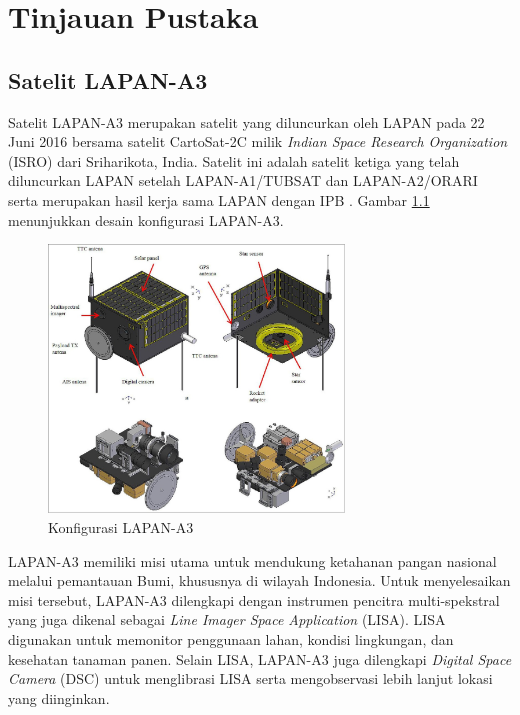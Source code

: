 \chapter{Tinjauan Pustaka}

\section{Satelit LAPAN-A3}

Satelit LAPAN-A3 merupakan satelit yang diluncurkan oleh LAPAN pada 22 Juni
2016 bersama satelit CartoSat-2C milik \textit{Indian Space Research
Organization} (ISRO) dari Sriharikota, India. Satelit ini adalah satelit ketiga
yang telah diluncurkan LAPAN setelah LAPAN-A1/TUBSAT dan LAPAN-A2/ORARI serta
merupakan hasil kerja sama LAPAN dengan IPB \cite{hasbi2013}. Gambar
\ref{fig:a3overview} menunjukkan desain konfigurasi LAPAN-A3.

\begin{figure}[!ht]
\setlength{}
\begin{center}
\includegraphics[width=0.7\textwidth]{fig/a3overview.jpg}
\caption{Konfigurasi LAPAN-A3}
\label{fig:a3overview}
\end{center}
\end{figure}

LAPAN-A3 memiliki misi utama untuk mendukung ketahanan pangan nasional melalui
pemantauan Bumi, khususnya di wilayah Indonesia. Untuk menyelesaikan misi
tersebut, LAPAN-A3 dilengkapi dengan instrumen pencitra multi-spekstral yang
juga dikenal sebagai \textit{Line Imager Space Application} (LISA). LISA digunakan
untuk memonitor penggunaan lahan, kondisi lingkungan, dan kesehatan tanaman panen.
Selain LISA, LAPAN-A3 juga dilengkapi \textit{Digital Space Camera} (DSC) untuk
menglibrasi LISA serta mengobservasi lebih lanjut lokasi yang diinginkan.

